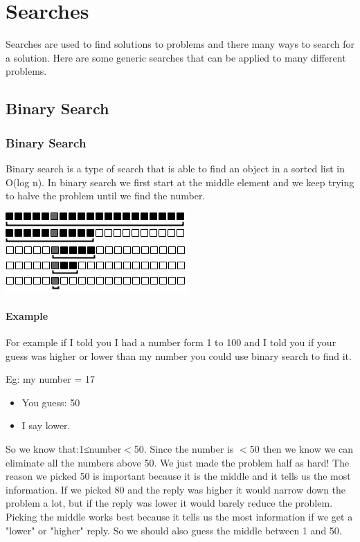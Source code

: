 \documentclass[11pt,oneside]{book}
\makeatletter
\def\maxwidth#1{\ifdim\Gin@nat@width>#1 #1\else\Gin@nat@width\fi}
\makeatother
\begin{document}
    \chapter{ Searches }
        

Searches are used to find solutions to problems and there many ways to search for a solution. Here are some generic searches that can be applied to many different problems.


        \section{ Binary Search }
        \subsection{Binary Search}

Binary search is a type of search that is able to find an object in a sorted list in O(log n). In binary search we first start at the middle element and we keep trying to halve the problem until we find the number.

\vspace{5px}\includegraphics[width=\maxwidth{\textwidth}]{binarysearch.png}

\subsubsection{Example}

For example if I told you I had a number form 1 to 100 and I told you if your guess was higher or lower than my number you could use binary search to find it.

Eg: my number = 17

\begin{itemize}
\item You guess: 50
\item I say lower.
\end{itemize}

So we know that:1≤number$<$50. Since the number is $<$50 then we know we can eliminate all the numbers above 50. We just made the problem half as hard! The reason we picked 50 is important because it is the middle and it tells us the most information. If we picked 80 and the reply was higher it would narrow down the problem a lot, but if the reply was lower it would barely reduce the problem. Picking the middle works best because it tells us the most information if we get a "lower" or "higher" reply. So we should also guess the middle between 1 and 50.
\end{document}
